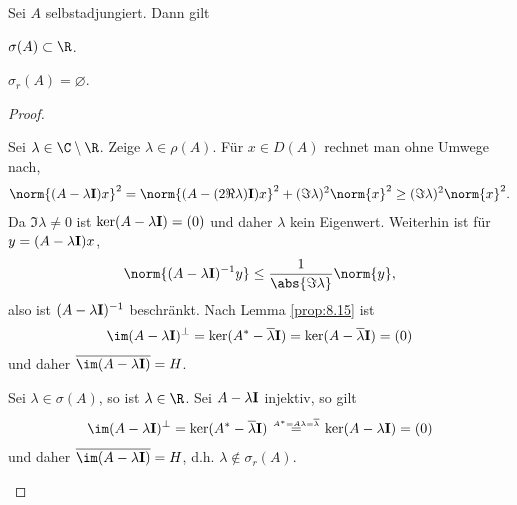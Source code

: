 \begin{prop}
\label{prop:8.15}
Sei $A$ selbstadjungiert. Dann gilt
\begin{propenum}
\item $\sigma(A)\subset\R$.
\item $\sigma_r(A)=\varnothing$.\fishhere
\end{propenum} 
\end{prop}
\begin{proof}
\begin{proofenum}
\item Sei $\lambda\in\C\setminus\R$. Zeige $\lambda\in\rho(A)$. Für $x\in D(A)$
rechnet man ohne Umwege nach,
\begin{align*}
\norm{(A-\lambda\Id)x}^2 = \norm{(A-(2\Re \lambda)\Id)x}^2 +
(\Im\lambda)^2\norm{x}^2
\ge (\Im\lambda)^2\norm{x}^2.
\end{align*}
Da $\Im \lambda\neq 0$ ist $\ker(A-\lambda\mathbf{I})= (0)$ und daher $\lambda$
kein Eigenwert. Weiterhin ist für $y=(A-\lambda\mathbf{I})x$,
\begin{align*}
\norm{(A-\lambda\Id)^{-1}y} \le \frac{1}{\abs{\Im \lambda}}\norm{y},
\end{align*}
also ist $(A-\lambda\mathbf{I})^{-1}$ beschränkt.
Nach Lemma \ref{prop:8.15} ist
\begin{align*}
\im(A-\lambda\Id)^\bot = \ker(A^*-\overline{\lambda}\Id)
=\ker(A-\overline{\lambda}\Id) = (0)
\end{align*}
und daher $\overline{\im (A-\lambda\Id)}=H$.
\item Sei $\lambda\in \sigma(A)$, so ist $\lambda\in\R$. Sei $A-\lambda\mathbf{I}$
injektiv, so gilt
\begin{align*}
\im(A-\lambda\Id)^\bot = \ker(A^*-\overline{\lambda}\Id)
\overset{\atop{A^*=A}{\lambda=\overline{\lambda}}}{=} \ker(A-\lambda\Id)=(0)      
\end{align*}
und daher $\overline{\im (A-\lambda\Id)} = H$, d.h. $\lambda\notin \sigma_r(A)$.\qedhere
\end{proofenum}
\end{proof}

